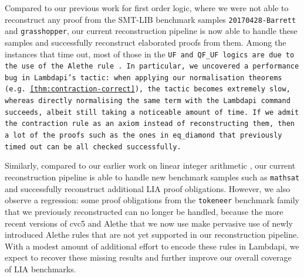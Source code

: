 Compared to our previous work \cite{ColtellacciMD24} for first order logic, where we were not able to reconstruct any proof from the SMT-LIB benchmark samples \texttt{20170428-Barrett} and \texttt{grasshopper},
our current reconstruction pipeline is now able to handle these samples and successfully reconstruct elaborated proofs from them.
Among the instances that time out, most of those in the \tt{UF} and \tt{QF\_UF} logics are due to the use of the Alethe rule .
In particular, we uncovered a performance bug in Lambdapi's  tactic: when applying our normalisation theorems (e.g. \cref{thm:contraction-correct}), the tactic becomes extremely slow, whereas directly normalising the same term with the Lambdapi command  succeeds, albeit still taking a noticeable amount of time.
If we admit the \tt{contraction} rule as an axiom instead of reconstructing them, then a lot of the proofs such as the ones in \tt{eq\_diamond} that previously timed out can be all checked successfully.

Similarly, compared to our earlier work on linear integer arithmetic \cite{MeLIA}, our current reconstruction pipeline is able to handle new benchmark samples such as \texttt{mathsat} and successfully reconstruct additional LIA proof obligations.
However, we also observe a regression: some proof obligations from the \texttt{tokeneer} benchmark family that we previously reconstructed can no longer be handled, because the more recent versions of cvc5 and Alethe that we now use make pervasive use of newly introduced Alethe rules that are not yet supported in our reconstruction pipeline.
With a modest amount of additional effort to encode these rules in Lambdapi, we expect to recover these missing results and further improve our overall coverage of LIA benchmarks.


\makeatletter
{}
\makeatother


